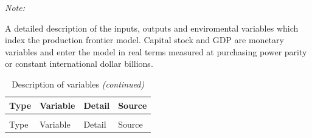 \documentclass[
  12pt,
]{article}
\begin{document}
\begin{ThreePartTable}
\begin{TableNotes}
\item \textit{Note: } 
\item A detailed description of the inputs, outputs and enviromental variables which index the production frontier model.  Capital stock and GDP are monetary variables and enter the model in real terms measured at purchasing power parity or constant international dollar billions.
\end{TableNotes}
\begin{longtable}[t]{>{\raggedright\arraybackslash}p{10em}>{\raggedright\arraybackslash}p{10em}>{\raggedright\arraybackslash}p{10em}>{\raggedright\arraybackslash}p{10em}}
\caption{\label{tab:VarsDescript}Description of variables}\\
\toprule
Type & Variable & Detail & Source\\
\midrule
\endfirsthead
\caption[]{\label{tab:VarsDescript}Description of variables \textit{(continued)}}\\
\toprule
Type & Variable & Detail & Source\\
\midrule
\endhead


\end{longtable}
\end{ThreePartTable}
\end{document}
